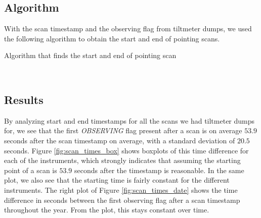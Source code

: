 \subsection{Algorithm}
With the scan timestamp and the observing flag from tiltmeter dumps, we used the following algorithm to obtain the start and end of pointing scans.

\begin{algorithm}[H]
    \caption{Algorithm that finds the start and end of pointing scan}
    \label{alg:scan_times}
    \begin{algorithmic}
            \Else
            \EndIf
        \EndFor
        \\
                \EndIf
                \EndIf
            \EndFor
        \EndFor
    \end{algorithmic}
\end{algorithm} 


\subsection{Results}
By analyzing start and end timestamps for all the scans we had tiltmeter dumps for,
we see that the first \textit{OBSERVING} flag present after a scan is on average $53.9$ seconds after the scan timestamp on average, with a standard deviation of $20.5$ seconds.
Figure \ref{fig:scan_times_box} shows boxplots of this time difference for each of the instruments, which strongly indicates that assuming the starting point of a scan is $53.9$ seconds after
the timestamp is reasonable.
In the same plot, we also see that the starting time is fairly constant for the different instruments.
The right plot of Figure \ref{fig:scan_times_date} shows the time difference in seconds between the first observing flag after a scan timestamp throughout the year.
From the plot, this stays constant over time.\\

